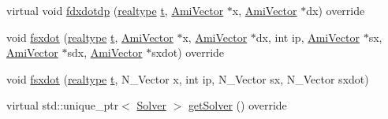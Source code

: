 \begin{DoxyCompactItemize}
\item 
virtual void \mbox{\hyperlink{classamici_1_1_model___o_d_e_afd60580b84c72713288796453f6da33a}{fdxdotdp}} (\mbox{\hyperlink{namespaceamici_a1bdce28051d6a53868f7ccbf5f2c14a3}{realtype}} \mbox{\hyperlink{classamici_1_1_model_a711281d57e9710226face29151cc4641}{t}}, \mbox{\hyperlink{classamici_1_1_ami_vector}{Ami\+Vector}} $\ast$x, \mbox{\hyperlink{classamici_1_1_ami_vector}{Ami\+Vector}} $\ast$dx) override
\item 
void \mbox{\hyperlink{classamici_1_1_model___o_d_e_a01f84575fd8df46a04fd472bbbc9d821}{fsxdot}} (\mbox{\hyperlink{namespaceamici_a1bdce28051d6a53868f7ccbf5f2c14a3}{realtype}} \mbox{\hyperlink{classamici_1_1_model_a711281d57e9710226face29151cc4641}{t}}, \mbox{\hyperlink{classamici_1_1_ami_vector}{Ami\+Vector}} $\ast$x, \mbox{\hyperlink{classamici_1_1_ami_vector}{Ami\+Vector}} $\ast$dx, int ip, \mbox{\hyperlink{classamici_1_1_ami_vector}{Ami\+Vector}} $\ast$sx, \mbox{\hyperlink{classamici_1_1_ami_vector}{Ami\+Vector}} $\ast$sdx, \mbox{\hyperlink{classamici_1_1_ami_vector}{Ami\+Vector}} $\ast$sxdot) override
\item 
void \mbox{\hyperlink{classamici_1_1_model___o_d_e_a786f028681b0928eb431cd44e9bd254a}{fsxdot}} (\mbox{\hyperlink{namespaceamici_a1bdce28051d6a53868f7ccbf5f2c14a3}{realtype}} \mbox{\hyperlink{classamici_1_1_model_a711281d57e9710226face29151cc4641}{t}}, N\+\_\+\+Vector x, int ip, N\+\_\+\+Vector sx, N\+\_\+\+Vector sxdot)
\item 
virtual std\+::unique\+\_\+ptr$<$ \mbox{\hyperlink{classamici_1_1_solver}{Solver}} $>$ \mbox{\hyperlink{classamici_1_1_model___o_d_e_aee7564098e889917627afd3c00772f81}{get\+Solver}} () override
\end{DoxyCompactItemize}
